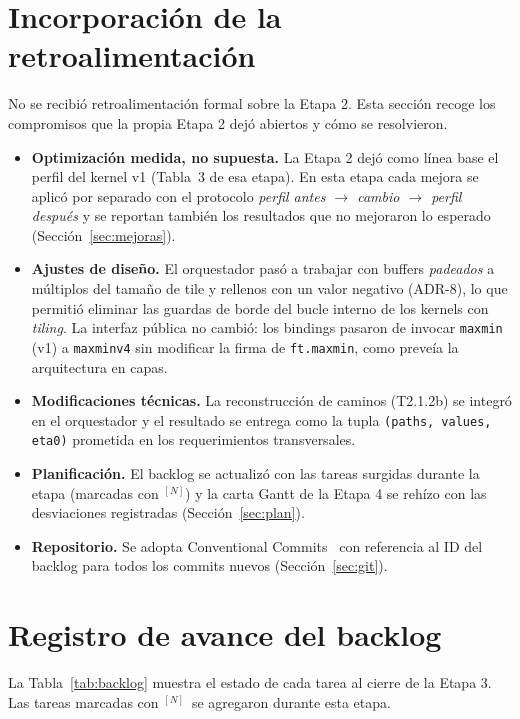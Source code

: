 \documentclass[11pt,a4paper]{article}
\newcommand{\N}{$^{[N]}$}
\begin{document}
\section{Incorporación de la retroalimentación}
No se recibió retroalimentación formal sobre la Etapa 2. Esta sección recoge los compromisos
que la propia Etapa 2 dejó abiertos y cómo se resolvieron.

\begin{itemize}
  \item \textbf{Optimización medida, no supuesta.} La Etapa 2 dejó como línea base el perfil
        del kernel v1 (Tabla~3 de esa etapa). En esta etapa cada mejora se aplicó por separado
        con el protocolo \emph{perfil antes $\rightarrow$ cambio $\rightarrow$ perfil después}
        y se reportan también los resultados que no
        mejoraron lo esperado (Sección~\ref{sec:mejoras}).
  \item \textbf{Ajustes de diseño.} El orquestador pasó a trabajar con buffers
        \emph{padeados} a múltiplos del tamaño de tile y rellenos con un valor negativo
        (ADR-8), lo que permitió eliminar las guardas de borde del bucle interno de los kernels
        con \emph{tiling}. La interfaz pública no cambió: los bindings pasaron de invocar
        \texttt{maxmin} (v1) a \texttt{maxminv4} sin modificar la firma de
        \texttt{ft.maxmin}, como preveía la arquitectura en capas.
  \item \textbf{Modificaciones técnicas.} La reconstrucción de caminos (T2.1.2b) se integró en
        el orquestador y el resultado se entrega como la tupla
        \texttt{(paths, values, eta0)} prometida en los requerimientos transversales.
  \item \textbf{Planificación.} El backlog se actualizó con las tareas surgidas durante la
        etapa (marcadas con \N) y la carta Gantt de la Etapa 4 se rehízo con las
        desviaciones registradas (Sección~\ref{sec:plan}).
  \item \textbf{Repositorio.} Se adopta Conventional Commits~\cite{cc} con referencia al ID
        del backlog para todos los commits nuevos (Sección~\ref{sec:git}).
\end{itemize}

\section{Registro de avance del backlog}
La Tabla~\ref{tab:backlog} muestra el estado de cada tarea al cierre de la Etapa 3. Las
tareas marcadas con \N\ se agregaron durante esta etapa.
\end{document}
